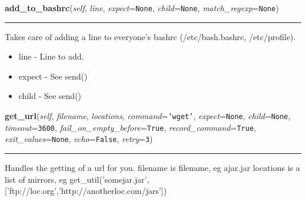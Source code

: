     \vspace{0.5ex}

\hspace{.8\funcindent}\begin{boxedminipage}{\funcwidth}

    \raggedright \textbf{add\_to\_bashrc}(\textit{self}, \textit{line}, \textit{expect}={\tt None}, \textit{child}={\tt None}, \textit{match\_regexp}={\tt None})

    \vspace{-1.5ex}

    \rule{\textwidth}{0.5\fboxrule}
\setlength{\parskip}{2ex}
    Takes care of adding a line to everyone's bashrc (/etc/bash.bashrc, 
    /etc/profile).

    \begin{itemize}
    \setlength{\parskip}{0.6ex}
      \item line   - Line to add.

      \item expect - See send()

      \item child  - See send()

    \end{itemize}

\setlength{\parskip}{1ex}
    \end{boxedminipage}

    \label{shutit_global:ShutIt:get_url}

    \vspace{0.5ex}

\hspace{.8\funcindent}\begin{boxedminipage}{\funcwidth}

    \raggedright \textbf{get\_url}(\textit{self}, \textit{filename}, \textit{locations}, \textit{command}={\tt \texttt{'}\texttt{wget}\texttt{'}}, \textit{expect}={\tt None}, \textit{child}={\tt None}, \textit{timeout}={\tt 3600}, \textit{fail\_on\_empty\_before}={\tt True}, \textit{record\_command}={\tt True}, \textit{exit\_values}={\tt None}, \textit{echo}={\tt False}, \textit{retry}={\tt 3})

    \vspace{-1.5ex}

    \rule{\textwidth}{0.5\fboxrule}
\setlength{\parskip}{2ex}
    Handles the getting of a url for you. filename is filename, eg ajar.jar
    locations is a list of mirrors, eg 
    get\_util('somejar.jar',['ftp://loc.org','http://anotherloc.com/jars'])

\setlength{\parskip}{1ex}
    \end{boxedminipage}

